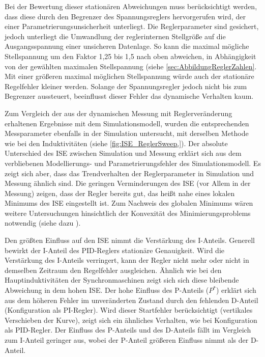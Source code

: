Bei der Bewertung dieser stationären Abweichungen muss berücksichtigt werden, dass diese durch den Begrenzer des Spannungsreglers hervorgerufen wird, der einer Parametrierungsunsicherheit unterliegt. Die Reglerparameter sind gesichert, jedoch unterliegt die Umwandlung der reglerinternen Stellgröße auf die Ausgangsspannung einer unsicheren Datenlage. So kann die maximal mögliche Stellspannung um den Faktor 1,25 bis 1,5 nach oben abweichen, in Abhängigkeit von der gewählten maximalen Stellspannung (siehe \cref{sec:AbbildungReglerZahlen}. Mit einer größeren maximal möglichen Stellspannung würde auch der stationäre Regelfehler kleiner werden. Solange der Spannungsregler jedoch nicht bis zum Begrenzer aussteuert, beeinflusst dieser Fehler das dynamische Verhalten kaum.

Zum Vergleich der aus der dynamischen Messung mit Reglerveränderung erhaltenen Ergebnisse mit dem Simulationsmodell, wurden die entsprechenden Messparameter ebenfalls in der Simulation untersucht, mit derselben Methode wie bei den Induktivitäten (siehe \cref{fig:ISE_ReglerSweep,}). Der absolute Unterschied des ISE zwischen Simulation und Messung erklärt sich aus dem verbliebenen Modellierungs- und Parametrierungsfehler des Simulationsmodell. Es zeigt sich aber, dass das Trendverhalten der Reglerparameter in Simulation und Messung ähnlich sind. Die geringen Verminderungen des ISE (vor Allem in der Messung) zeigen, dass der Regler bereits gut, das heißt nahe eines lokalen Minimums des ISE eingestellt ist. Zum Nachweis des globalen Minimums wären weitere Untersuchungen hinsichtlich der Konvexität des Minimierungsproblems notwendig (siehe dazu \cite{eschVerfahrenZurGuteoptimalen2016}).

Den größten Einfluss auf den ISE nimmt die Verstärkung des I-Anteils. Generell bewirkt der I-Anteil des PID-Reglers stationäre Genauigkeit. Wird die Verstärkung des I-Anteils verringert, kann der Regler nicht mehr oder nicht in demselben Zeitraum den Regelfehler ausgleichen. Ähnlich wie bei den Hauptinduktivitäten der Synchronmaschinen zeigt sich sich diese bleibende Abweichung in dem hohen ISE. Der hohe Einfluss des P-Anteils ($P^*$) erklärt sich aus dem höheren Fehler im unveränderten Zustand durch den fehlenden D-Anteil (Konfiguration als PI-Regler). Wird dieser Startfehler berücksichtigt (vertikales Verschieben der Kurve), zeigt sich ein ähnliches Verhalten, wie bei Konfiguration als PID-Regler. Der Einfluss des P-Anteils und des D-Anteils fällt im Vergleich zum I-Anteil geringer aus, wobei der P-Anteil größeren Einfluss nimmt als der D-Anteil.

